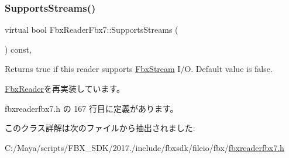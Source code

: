 \subsubsection{\texorpdfstring{Supports\+Streams()}{SupportsStreams()}}
{\footnotesize\ttfamily virtual bool Fbx\+Reader\+Fbx7\+::\+Supports\+Streams (\begin{DoxyParamCaption}{ }\end{DoxyParamCaption}) const\hspace{0.3cm}{\ttfamily [inline]}, {\ttfamily [virtual]}}

Returns true if this reader supports \hyperlink{class_fbx_stream}{Fbx\+Stream} I/O. Default value is false. 

\hyperlink{class_fbx_reader_ab08a9e71a059ef6052e7fe2d8ba6c35d}{Fbx\+Reader}を再実装しています。



 fbxreaderfbx7.\+h の 167 行目に定義があります。



このクラス詳解は次のファイルから抽出されました\+:\begin{DoxyCompactItemize}
\item 
C\+:/\+Maya/scripts/\+F\+B\+X\+\_\+\+S\+D\+K/2017./include/fbxsdk/fileio/fbx/\hyperlink{fbxreaderfbx7_8h}{fbxreaderfbx7.\+h}\end{DoxyCompactItemize}
